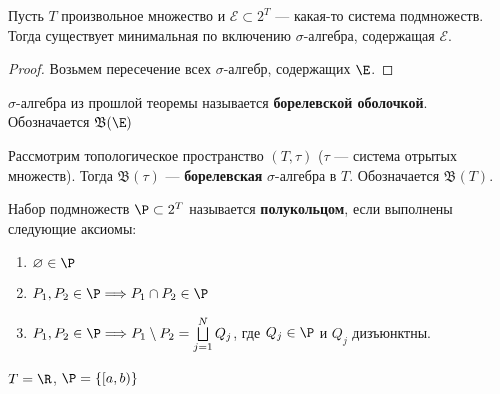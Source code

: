 \begin{thm}
	Пусть $ T$ произвольное множество и $ \mathcal{E} \subset 2^{T}$ --- какая-то система подмножеств. Тогда существует минимальная по включению $ \sigma $-алгебра, содержащая $ \mathcal{E}$.
\end{thm}
\begin{proof}
    Возьмем пересечение всех $\sigma$-алгебр, содержащих $\E$.
\end{proof}

\begin{defn}
	$\sigma$-алгебра из прошлой теоремы называется {\bf борелевской оболочкой}.  
		Обозначается $ \mathfrak{B}(\E)$
\end{defn}
\begin{defn}
	Рассмотрим топологическое пространство $ (T, \tau )$ ($ \tau $ --- система отрытых множеств). Тогда $ \mathfrak{B}(\tau )$ --- {\bf борелевская}  $\sigma$-алгебра в $ T$. Обозначается $ \mathfrak{B}(T)$.
\end{defn}

\begin{defn}[Полукольцо]
    Набор подмножеств $ \P \subset 2^{T}$ называется {\bf полукольцом}, если выполнены следующие аксиомы:
\begin{enumerate}[label=(\roman*),noitemsep]
    \item  $ \varnothing \in \P$
	\item $ P_1, P_2 \in \P \Longrightarrow  P_1 \cap P_2 \in \P$

	\item $ P_1, P_2 \in \P \Longrightarrow P_1 \setminus P_2 = \bigsqcup\limits_{j=1}^{N} Q_{j} $, где $ Q_j \in \P$ и $ Q_j$ дизъюнктны.
\end{enumerate} 
\end{defn}

\begin{ex}
	$ T= \R$, $ \P = \{[a, b)\}$
\end{ex}

